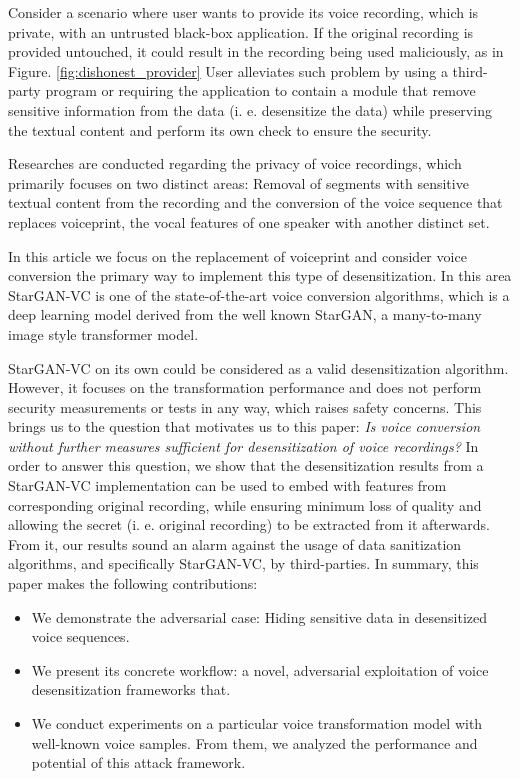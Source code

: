 \documentclass[journal]{IEEEtran} %
\begin{document}
Consider a scenario where user wants to provide its voice recording, which is private, with an untrusted black-box application. If the original recording is provided untouched, it could result in the recording being used maliciously, as in Figure. \ref{fig:dishonest_provider} User alleviates such problem by using a third-party program or requiring the application to contain a module that remove sensitive information from the data (i. e. desensitize the data) while preserving the textual content and perform its own check to ensure the security.

Researches are conducted regarding the privacy of voice recordings, which primarily focuses on two distinct areas: Removal of segments with sensitive textual content from the recording and the conversion of the voice sequence that replaces voiceprint, the vocal features of one speaker with another distinct set.

In this article we focus on the replacement of voiceprint and consider voice conversion the primary way to implement this type of desensitization. In this area StarGAN-VC is one of the state-of-the-art voice conversion algorithms, which is a deep learning model derived from the well known StarGAN, a many-to-many image style transformer model.

StarGAN-VC on its own could be considered as a valid desensitization algorithm. However, it focuses on the transformation performance and does not perform security measurements or tests in any way, which raises safety concerns. This brings us to the question that motivates us to this paper: \textit{Is voice conversion without further measures sufficient for desensitization of voice recordings?} In order to answer this question, we show that the desensitization results from a StarGAN-VC implementation can be used to embed with features from corresponding original recording, while ensuring minimum loss of quality and allowing the secret (i. e. original recording) to be extracted from it afterwards. From it, our results sound an alarm against the usage of data sanitization algorithms, and specifically StarGAN-VC, by third-parties. In summary, this paper makes the following contributions:

\begin{itemize}

\item We demonstrate the adversarial case: Hiding sensitive data in desensitized voice sequences.

\item We present its concrete workflow: a novel, adversarial exploitation of voice desensitization frameworks that.

\item We conduct experiments on a particular voice transformation model with well-known voice samples. From them, we analyzed the performance and potential of this attack framework.

\end{itemize}
\end{document}
